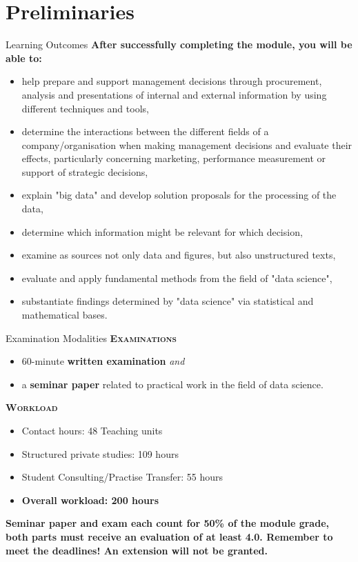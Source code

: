 \documentclass[document.tex]{subfiles}
\begin{document}
    
    \section{Preliminaries}
    
    \begin{frame}{Learning Outcomes}
        \textbf{After successfully completing the module, you will be able to:}
        \begin{itemize}
            \item help prepare and support management decisions through procurement, analysis and presentations of internal and external information by using different techniques and tools,
            \item determine the interactions between the different fields of a company/organisation when making management decisions and evaluate their effects, particularly concerning marketing, performance measurement or support of strategic decisions,
            \item explain "big data" and develop solution proposals for the processing of the data,
            \item determine which information might be relevant for which decision,
            \item examine as sources not only data and figures, but also unstructured texts,
            \item evaluate and apply fundamental methods from the field of "data science",
            \item substantiate findings determined by "data science" via statistical and mathematical bases.
        \end{itemize}
    \end{frame}

    \begin{frame}{Examination Modalities}
        \alert{\textbf{\textsc{Examinations}}}
        \vspace{-1mm}
        \begin{itemize}
            \item 60-minute \textbf{written examination} \textit{and}
            \item a \textbf{seminar paper} related to practical work in the field of data science.
        \end{itemize}

        \alert{\textbf{\textsc{Workload}}}
        \vspace{-1mm}
        \begin{itemize}
            \item Contact hours: 48 Teaching units
            \item Structured private studies: 109 hours
            \item Student Consulting/Practise Transfer: 55 hours
            \item \textbf{Overall workload: 200 hours}
        \end{itemize}
        	
        \textbf{Seminar paper and exam each count for 50\% of the module grade, both parts must receive an evaluation of at least 4.0. Remember to meet the deadlines! An extension will not be granted.}
    \end{frame}
\end{document}
